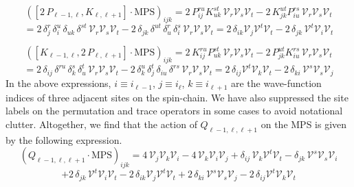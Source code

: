%
%
\begin{equation*}
([2 \, P_{\ell-1,\ell}, K_{\ell,\ell+1}] \cdot \text{MPS})_{ijk}
=
2 \, P^{ru}_{ij} K^{st}_{uk} \, \mathcal{V}_r \mathcal{V}_s \mathcal{V}_t
-
2 \, K^{ut}_{jk} P^{rs}_{iu} \, \mathcal{V}_r \mathcal{V}_s \mathcal{V}_t
\end{equation*}
%
%
\begin{equation}
=
2 \, \delta^r_j \, \delta^u_i \, \delta_{uk} \, \delta^{st} \, \mathcal{V}_r \mathcal{V}_s \mathcal{V}_t
-
2 \, \delta_{jk} \, \delta^{ut} \, \delta^r_u \, \delta^s_i \, \mathcal{V}_r \mathcal{V}_s \mathcal{V}_t
=
2 \, \delta_{ik} \mathcal{V}_j \mathcal{V}^t \mathcal{V}_t
-
2 \, \delta_{jk} \, \mathcal{V}^t \mathcal{V}_i \mathcal{V}_t
\end{equation}
%
%

%
%
\begin{equation*}
([K_{\ell-1,\ell}, 2 \, P_{\ell,\ell+1}] \cdot \text{MPS})_{ijk}
=
2 \, K^{ru}_{ij} P^{st}_{uk} \, \mathcal{V}_r \mathcal{V}_s \mathcal{V}_t
-
2 \, P^{ut}_{jk} K^{rs}_{iu} \, \mathcal{V}_r \mathcal{V}_s \mathcal{V}_t
\end{equation*}
%
%
\begin{equation}
=
2 \, \delta_{ij} \, \delta^{ru} \, \delta^s_k \, \delta^t_u \, \mathcal{V}_r \mathcal{V}_s \mathcal{V}_t
-
2 \, \delta^u_k \, \delta^t_j \, \delta_{iu} \, \delta^{rs} \, \mathcal{V}_r \mathcal{V}_s \mathcal{V}_t
=
2 \, \delta_{ij} \mathcal{V}^t \mathcal{V}_k \mathcal{V}_t
-
2 \, \delta_{ki} \, \mathcal{V}^s \mathcal{V}_s \mathcal{V}_j
\end{equation}
%
%
In the above expressions, $i \equiv i_{\ell-1}$, $j \equiv i_{\ell}$, $k \equiv i_{\ell+1}$ are the wave-function indices of three adjacent sites on the spin-chain. We have also suppressed the site labels on the permutation and trace operators in some cases to avoid notational clutter. Altogether, we find that the action of $Q_{\ell-1,\ell,\ell+1}$ on the MPS is given by the following expression.
%
%
\begin{equation*}
(Q_{\ell-1,\ell,\ell+1} \cdot \text{MPS})_{ijk}
=
4 \, \mathcal{V}_j \mathcal{V}_k \mathcal{V}_i
-
4 \, \mathcal{V}_k \mathcal{V}_i \mathcal{V}_j
+
\delta_{ij} \, \mathcal{V}_k \mathcal{V}^t \mathcal{V}_t
-
\delta_{jk} \, \mathcal{V}^s \mathcal{V}_s \mathcal{V}_i
\end{equation*}
%
%
\begin{equation}\label{Q_3 piece on MPS general}
+
2 \, \delta_{jk} \, \mathcal{V}^t \mathcal{V}_i \mathcal{V}_t
-
2 \, \delta_{ik} \mathcal{V}_j \mathcal{V}^t \mathcal{V}_t
+
2 \, \delta_{ki} \, \mathcal{V}^s \mathcal{V}_s \mathcal{V}_j
-
2 \, \delta_{ij} \mathcal{V}^t \mathcal{V}_k \mathcal{V}_t
\end{equation}
